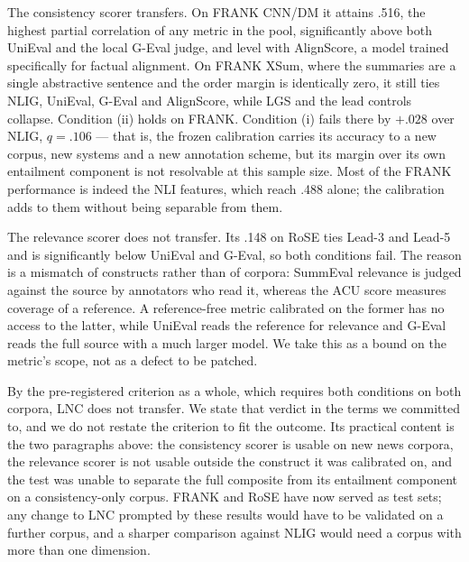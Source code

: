 The consistency scorer transfers. On FRANK CNN/DM it attains .516, the highest partial correlation of any metric in the pool, significantly above both UniEval and the local G-Eval judge, and level with AlignScore, a model trained specifically for factual alignment. On FRANK XSum, where the summaries are a single abstractive sentence and the order margin is identically zero, it still ties NLIG, UniEval, G-Eval and AlignScore, while LGS and the lead controls collapse. Condition (ii) holds on FRANK. Condition (i) fails there by $+.028$ over NLIG, $q=.106$ --- that is, the frozen calibration carries its accuracy to a new corpus, new systems and a new annotation scheme, but its margin over its own entailment component is not resolvable at this sample size. Most of the FRANK performance is indeed the NLI features, which reach .488 alone; the calibration adds to them without being separable from them.

The relevance scorer does not transfer. Its .148 on RoSE ties Lead-3 and Lead-5 and is significantly below UniEval and G-Eval, so both conditions fail. The reason is a mismatch of constructs rather than of corpora: SummEval relevance is judged against the source by annotators who read it, whereas the ACU score measures coverage of a reference. A reference-free metric calibrated on the former has no access to the latter, while UniEval reads the reference for relevance and G-Eval reads the full source with a much larger model. We take this as a bound on the metric's scope, not as a defect to be patched.

By the pre-registered criterion as a whole, which requires both conditions on both corpora, LNC does not transfer. We state that verdict in the terms we committed to, and we do not restate the criterion to fit the outcome. Its practical content is the two paragraphs above: the consistency scorer is usable on new news corpora, the relevance scorer is not usable outside the construct it was calibrated on, and the test was unable to separate the full composite from its entailment component on a consistency-only corpus. FRANK and RoSE have now served as test sets; any change to LNC prompted by these results would have to be validated on a further corpus, and a sharper comparison against NLIG would need a corpus with more than one dimension.
